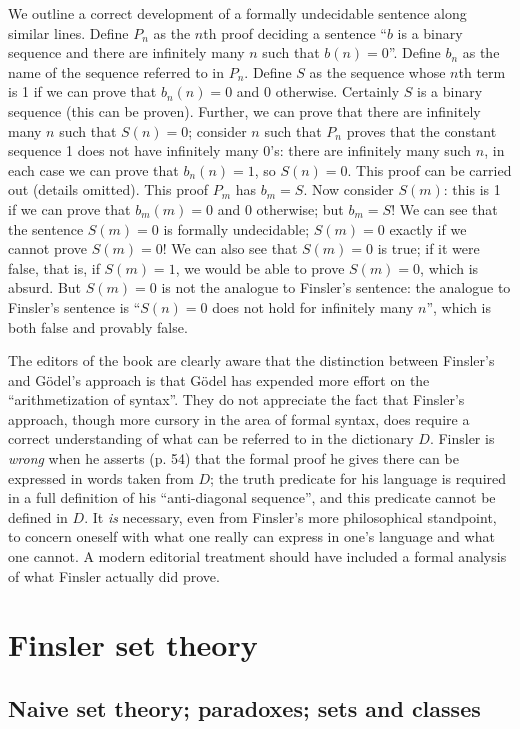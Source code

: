 We outline a correct development of a formally undecidable sentence
along similar lines. Define $P_n$ as the $n$th proof deciding a
sentence ``$b$ is a binary sequence and there are infinitely many $n$
such that $b(n)=0$''.  Define $b_n$ as the name of the sequence
referred to in $P_n$.  Define $S$ as the sequence whose $n$th term is
1 if we can prove that $b_n(n)=0$ and 0 otherwise.  Certainly $S$ is a
binary sequence (this can be proven).  Further, we can prove that
there are infinitely many $n$ such that $S(n)=0$; consider $n$ such
that $P_n$ proves that the constant sequence 1 does not have
infinitely many 0's: there are infinitely many such $n$, in each case
we can prove that $b_n(n)=1$, so $S(n)=0$.  This proof can be carried
out (details omitted).  This proof $P_m$ has $b_m = S$.  Now consider
$S(m)$: this is 1 if we can prove that $b_m(m)=0$ and 0 otherwise; but
$b_m = S$!  We can see that the sentence $S(m) = 0$ is formally
undecidable; $S(m)=0$ exactly if we cannot prove $S(m)=0$!  We can
also see that $S(m) = 0$ is true; if it were false, that is, if
$S(m)=1$, we would be able to prove $S(m)=0$, which is absurd.  But
$S(m)=0$ is not the analogue to Finsler's sentence: the analogue to
Finsler's sentence is ``$S(n)=0$ does not hold for infinitely many
$n$'', which is both false and provably false.

The editors of the book are clearly aware that the distinction between
Finsler's and G\"odel's approach is that G\"odel has expended more
effort on the ``arithmetization of syntax''.  They do not appreciate
the fact that Finsler's approach, though more cursory in the area of
formal syntax, does require a correct understanding of what can be
referred to in the dictionary $D$.  Finsler is {\em wrong\/} when he
asserts (p. 54) that the formal proof he gives there can be expressed
in words taken from $D$; the truth predicate for his language is
required in a full definition of his ``anti-diagonal sequence'', and
this predicate cannot be defined in $D$.  It {\em is\/} necessary,
even from Finsler's more philosophical standpoint, to concern oneself
with what one really can express in one's language and what one
cannot.  A modern editorial treatment should have included a formal
analysis of what Finsler actually did prove.

\section{Finsler set theory}

\subsection{Naive set theory; paradoxes; sets and classes}

